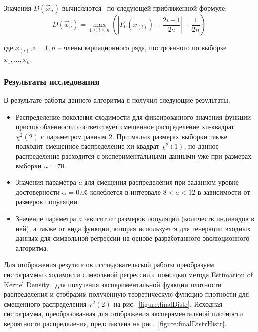 Значения $D(\vec{x}_n)$ вычисляются~\cite{BlueStatistics} по следующей приближенной формуле:
\begin{equation}
D(\vec{x}_n) = \max_{1 \leq i \leq n} \left ( \left | F_0(x_{(i)}) - \frac{2i - 1}{2n} \right | + \frac{1}{2n}  \right )
\end{equation}
\begin{ESKDExplanation}
\item[где ] $x_{(i)}, i = \overline{1,n}$ -- члены вариационного ряда, построенного по выборке $x_1, ..., x_n$.
\end{ESKDExplanation}

\subsubsection{Результаты исследования}
В результате работы данного алгоритма я получил следующие результаты:
\begin{itemize}
\item Распределение поколения сходимости для фиксированного значения функции приспособленности соответствует смещенное распределение хи-квадрат $\chi^2(2)$ с параметром равным 2. При малых размерах выборки также подходит смещенное распределение хи-квадрат $\chi^2(1)$, но данное распределение расходится с экспериментальными данными уже при размерах выборки $n = 70$.
\item Значения параметра $a$ для смещения распределения при заданном уровне достоверности $\alpha = 0.05$ колеблется в интервале $8 < a < 12$ в зависимости от размеров популяции.
\item Значение параметра $a$ зависит от размеров популяции (количеств индивидов в ней), а также от вида функции, которая используется для генерации входных данных для символьной регрессии на основе разработанного эволюционного алгоритма.
\end{itemize}

Для отображения результатов исследовательской работы преобразуем гистограммы сходимости символьной регрессии с помощью метода Estimation of Kernel Density~\cite{KernelDensity} для получения экспериментальной функции плотности распределения и отобразим полученную теоретическую функцию плотности для смещенного распределения $\chi^2(2)$ на рис.~\ref{figure:finalDistr}. Исходная гистограмма, преобразованная для отображения экспериментальной плотности вероятности распределения, представлена на рис.~\ref{figure:finalDistrHistr}.

